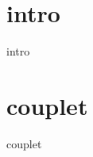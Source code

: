 \documentclass[11pt]{article}
\begin{document}
\makesongtitle



\newpage
\section*{intro}
{intro}
\section*{couplet}
{couplet}
\end{document}
